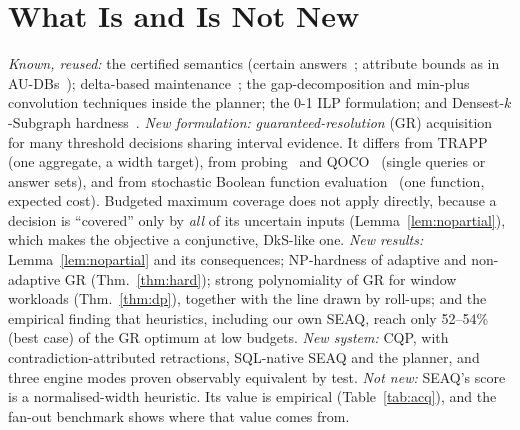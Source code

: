 \documentclass[conference]{IEEEtran}
\newcommand{\seaq}{SEAQ\xspace}
\begin{document}
\section{What Is and Is Not New}
\label{sec:novelty}
\emph{Known, reused:} the certified semantics (certain answers~\cite{imielinski1984,libkin2016}; attribute bounds as in
AU-DBs~\cite{feng2021audb}); delta-based maintenance~\cite{gupta1993}; the gap-decomposition and min-plus convolution
techniques inside the planner; the 0-1 ILP formulation; and Densest-$k$-Subgraph hardness~\cite{feige2001dks}.
\emph{New formulation:} \emph{guaranteed-resolution} (GR) acquisition for many threshold decisions sharing interval
evidence. It differs from TRAPP~\cite{olston2000trapp} (one aggregate, a width target), from probing~\cite{cheng2003} and
QOCO~\cite{bergman2015qoco} (single queries or answer sets), and from stochastic Boolean function
evaluation~\cite{deshpande2014sbfe} (one function, expected cost). Budgeted maximum coverage does not apply directly,
because a decision is ``covered'' only by \emph{all} of its uncertain inputs (Lemma~\ref{lem:nopartial}), which makes
the objective a conjunctive, DkS-like one. \emph{New results:} Lemma~\ref{lem:nopartial} and its consequences; NP-hardness of
adaptive and non-adaptive GR (Thm.~\ref{thm:hard}); strong polynomiality of GR for window workloads (Thm.~\ref{thm:dp}),
together with the line drawn by roll-ups; and the empirical finding that heuristics, including our own \seaq{}, reach
only 52--54\% (best case) of the GR optimum at low budgets. \emph{New system:} CQP, with contradiction-attributed
retractions, SQL-native \seaq{} and the planner, and three engine modes proven observably equivalent by test.
\emph{Not new:} \seaq's score is a normalised-width heuristic. Its value is empirical (Table~\ref{tab:acq}), and the
fan-out benchmark shows where that value comes from.
\end{document}

